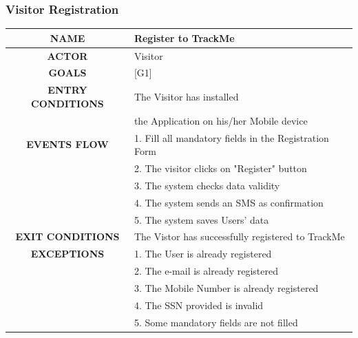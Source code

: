 \documentclass[12pt,a4paper]{article}
\begin{document}
		\subsubsection{Visitor Registration}
		\begin{center}
			\begin{tabular}{| c | l |}
				\hline
				\textbf{NAME} & Register to TrackMe \\
				\hline
				\textbf{ACTOR} & Visitor \\
				\hline
				\textbf{GOALS} & [G1] \\
				\hline
				\textbf{ENTRY CONDITIONS} & The Visitor has installed \\
				&	the Application on his/her Mobile device \\ \hline
				\textbf{EVENTS FLOW}  &
				1. Fill all mandatory fields in the Registration Form\\
				&2. The visitor clicks on "Register" button\\
				&3. The system checks data validity\\
				&4. The system sends an SMS as confirmation\\
				&5. The system saves Users' data\\
				\hline
				\textbf{EXIT CONDITIONS}  & The Vistor has successfully registered to TrackMe\\ \hline
				\textbf{EXCEPTIONS} &
				1. The User is already registered\\
				&2. The e-mail is already registered\\
				&3. The Mobile Number is already registered\\
				&4. The SSN provided is invalid\\
				&5. Some mandatory fields are not filled\\
				\hline
			\end{tabular}
		\end{center}
\end{document}
